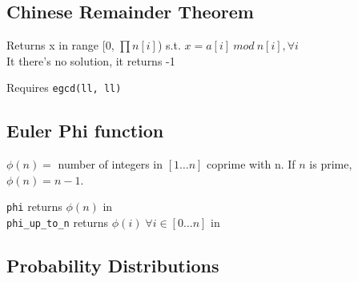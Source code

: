 \subsection{Chinese Remainder Theorem}
Returns x in range [0, $\prod{n[i]}$) s.t.
$x = a[i] \: mod \: n[i], \forall i$ \\
It there's no solution, it returns -1

Requires \verb|egcd(ll, ll)|



\subsection{Euler Phi function}
$\phi(n) = $ number of integers in $[1\ldots n]$ coprime with n. If $n$ is prime, $\phi(n)=n-1$.

\verb|phi| returns $\phi(n)$ in  \\
\verb|phi_up_to_n| returns $\phi(i) \; \forall i \in [0 \ldots n]$ in 



\subsection{Probability Distributions}

